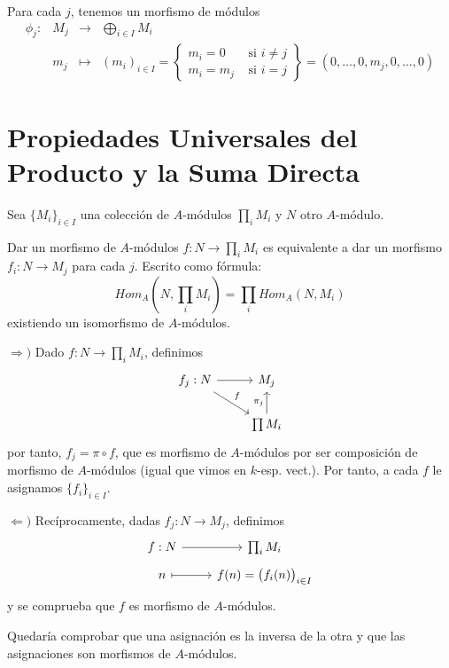 Para cada $j$, tenemos un morfismo de m\'odulos
$$\begin{array}{rrcl} \phi_j: & M_j & {\longrightarrow} & \displaystyle \bigoplus _{i \in I} M_i \\
& m_j & \longmapsto & (m_i)_{i \in I} = \left\{\begin{array}{lr}
     m_i = 0 & \text{ si } i \neq j  \\
     m_i=m_j & \text{ si } i=j 
\end{array}\right\} = (0,\ldots, 0, m_j,0,\ldots ,0)\end{array}$$

\section{Propiedades Universales del Producto y la Suma Directa}

Sea $\{M_i\}_{i \in I}$ una colecci\'on de $A$-m\'odulos $\prod_i M_i$ y $N$ otro $A$-m\'odulo. 
\begin{propi}
    Dar un morfismo de $A$-m\'odulos $f: N \longrightarrow \prod_i M_i $ es equivalente a dar un morfismo $f_i : N \longrightarrow M_j$ para cada $j$. Escrito como f\'ormula:
    $$Hom_A\left(N, \prod_i M_i\right) = \prod _i Hom_A (N, M_i)$$
    existiendo un isomorfismo de $A$-m\'odulos.
\end{propi}
\begin{dem}
    $\Rightarrow)$ Dado $f: N \rightarrow \prod_i M_i$, definimos
    $$\bt 
    f_j: N \arrow{r} \arrow{dr}{f} & M_j \\ 
    & \prod M_i \arrow{u}{\pi_j}
    \et$$
    por tanto, $f_j = \pi \circ f$, que es morfismo de $A$-m\'odulos por ser composici\'on de morfismo de $A$-m\'odulos (igual que vimos en $k$-esp. vect.). Por tanto, a cada $f$ le asignamos $\{f_i\}_{i \in I}$.

    $\Leftarrow)$ Rec\'iprocamente, dadas $f_j: N \longrightarrow M_j$, definimos 
    $$\bt f:  N \arrow{r} &\prod_i M_i\\[-5mm]
    n \arrow[mapsto]{r} & f(n) = \big(f_i(n)\big)_{i \in I}\et$$
    y se comprueba que $f$ es morfismo de $A$-m\'odulos.

    Quedar\'ia comprobar que una asignaci\'on es la inversa de la otra y que las asignaciones son morfismos de $A$-m\'odulos.
\end{dem}

